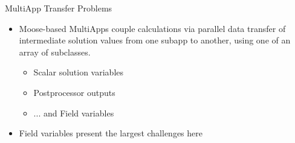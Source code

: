%
%


\begin{frame}{MultiApp Transfer Problems}
\begin{itemize}\itemsep=.07\textheight
  \item Moose-based MultiApps couple calculations via parallel data
    transfer of intermediate solution values from one subapp to
    another, using one of an array of 
    subclasses.
  \begin{itemize}
    \item Scalar solution variables
    \item Postprocessor outputs
    \item ... and Field variables
  \end{itemize}
\end{itemize}

\vfill

\begin{itemize}\itemsep=.07\textheight
  \item Field variables present the largest challenges here
\end{itemize}
\end{frame}
